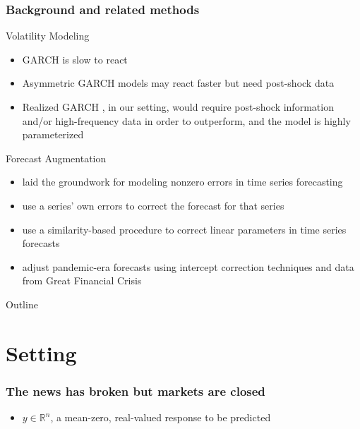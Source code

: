 \documentclass{beamer}
\begin{document}
\begin{frame}
    \frametitle{Background and related methods}
    Volatility Modeling

    \begin{itemize}
        \item GARCH is slow to react \parencite[][]{andersen2003modeling}
        \item Asymmetric GARCH models may react faster but need post-shock data 
        \item Realized GARCH \parencite[][]{hansen2012realized}, in our setting, would require post-shock information and/or high-frequency data in order to outperform, and the model is highly parameterized 
    \end{itemize}

    Forecast Augmentation
    \begin{itemize}
        \item \cite[][]{clements1996intercept,clements1998forecasting} laid the groundwork for modeling nonzero errors in time series forecasting
        \item \cite[][]{guerron2017macroeconomic} use a series' own errors to correct the forecast for that series
        \item \cite[][]{dendramis2020similarity} use a similarity-based procedure to correct linear parameters in time series forecasts
        \item \cite[][]{foroni2022forecasting} adjust pandemic-era forecasts using intercept correction techniques and data from Great Financial Crisis
    \end{itemize} 
\end{frame}

\begin{frame}{Outline}
    \tableofcontents
\end{frame}

\section{Setting}

\begin{frame}
\frametitle{The news has broken but markets are closed}

\begin{itemize}
\item $y\in \mathbb{R}^{n}$, a mean-zero, real-valued response to be predicted 

\end{itemize}
\end{frame}
\end{document}
